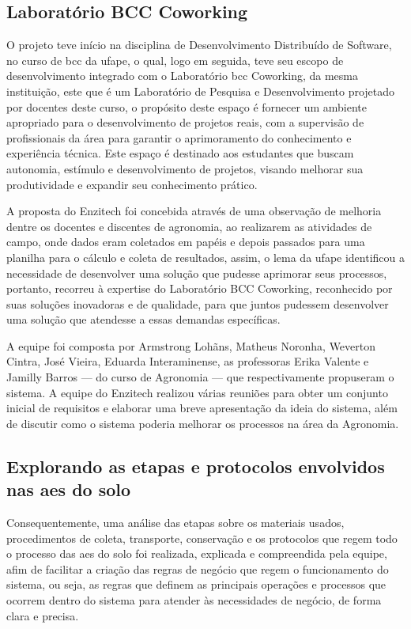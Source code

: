 \subsection{Laboratório BCC Coworking}\label{sec:lab}
O projeto teve início na disciplina de Desenvolvimento Distribuído de Software, no curso de \ac{bcc} da \ac{ufape}, o qual, logo em seguida, teve seu escopo de desenvolvimento integrado com o Laboratório \ac{bcc} Coworking, da mesma instituição, este que é um Laboratório de Pesquisa e Desenvolvimento projetado por docentes deste curso, o propósito deste espaço é fornecer um ambiente apropriado para o desenvolvimento de projetos reais, com a supervisão de profissionais da área para garantir o aprimoramento do conhecimento e experiência técnica. Este espaço é destinado aos estudantes que buscam autonomia, estímulo e desenvolvimento de projetos, visando melhorar sua produtividade e expandir seu conhecimento prático.

A proposta do Enzitech foi concebida através de uma observação de melhoria dentre os docentes e discentes de agronomia, ao realizarem as atividades de campo, onde dados eram coletados em papéis e depois passados para uma planilha para o cálculo e coleta de resultados, assim, o \ac{lema} da \ac{ufape} identificou a necessidade de desenvolver uma solução que pudesse aprimorar seus processos, portanto, recorreu à expertise do Laboratório BCC Coworking, reconhecido por suas soluções inovadoras e de qualidade, para que juntos pudessem desenvolver uma solução que atendesse a essas demandas específicas. 

A equipe foi composta por Armstrong Lohãns, Matheus Noronha, Weverton Cintra, José Vieira, Eduarda Interaminense, as professoras Erika Valente e Jamilly Barros — do curso de Agronomia — que respectivamente propuseram o sistema. A equipe do Enzitech realizou várias reuniões para obter um conjunto inicial de requisitos e elaborar uma breve apresentação da ideia do sistema, além de discutir como o sistema poderia melhorar os processos na área da Agronomia.

\subsection{Explorando as etapas e protocolos envolvidos nas \acp{ae} do solo}
Consequentemente, uma análise das etapas sobre os materiais usados, procedimentos de coleta, transporte, conservação e os protocolos que regem todo o processo das \acp{ae} do solo foi realizada, explicada e compreendida pela equipe, afim de facilitar a criação das regras de negócio que regem o funcionamento do sistema, ou seja, as regras que definem as principais operações e processos que ocorrem dentro do sistema para atender às necessidades de negócio, de forma clara e precisa.

